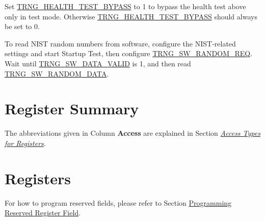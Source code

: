 \documentclass[main\_\_EN.tex]{subfiles}
\begin{document}
Set \hyperref[fielddesc:TRNGHEALTHTESTBYPASS]{TRNG\_HEALTH\_TEST\_BYPASS} to 1 to bypass the health test above only in test mode. Otherwise \hyperref[fielddesc:TRNGHEALTHTESTBYPASS]{TRNG\_HEALTH\_TEST\_BYPASS} should always be set to 0.

To read NIST random numbers from software, configure the NIST-related settings and start Startup Test, then configure \hyperref[fielddesc:TRNGSWRANDOMREQ]{TRNG\_SW\_RANDOM\_REQ}. Wait until \hyperref[fielddesc:TRNGSWDATAVALID]{TRNG\_SW\_DATA\_VALID} is 1, and then read \hyperref[fielddesc:TRNGSWRANDOMDATA]{TRNG\_SW\_RANDOM\_DATA}.


\newpage
\hypertarget{rng-reg-summ}{}
\section{Register Summary}
\label{sec:rng-reg-summ}




The abbreviations given in Column \textbf{Access} are explained in Section \hyperref[glossary-access-types]{\textit{Access Types for Registers}}.






\section{Registers}
\label{sec:rng-reg}

For how to program reserved fields, please refer to Section \hyperref[programming-reserved-field]{Programming Reserved Register Field}.


\end{document}
